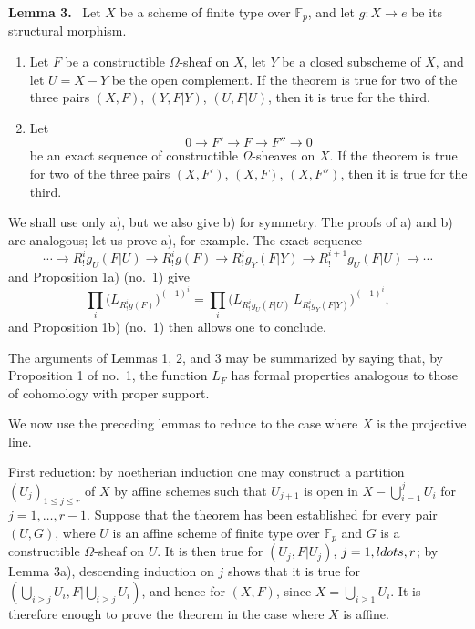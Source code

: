 \documentclass[11pt]{article}
\newenvironment{statement}[1]{\par\medskip\noindent\textbf{#1.}\ }{\par\medskip}
\begin{document}
\begin{statement}{Lemma 3}
Let $X$ be a scheme of finite type over $\mathbb F_p$, and let $g:X\to e$ be its structural morphism.
\begin{enumerate}[label=\alph*)]
\item Let $F$ be a constructible $\Omega$-sheaf on $X$, let $Y$ be a closed subscheme of $X$, and let $U=X-Y$ be the open complement. If the theorem is true for two of the three pairs $(X,F)$, $(Y,F|Y)$, $(U,F|U)$, then it is true for the third.
\item Let
\[
0\longrightarrow F'\longrightarrow F\longrightarrow F''\longrightarrow0
\]
be an exact sequence of constructible $\Omega$-sheaves on $X$. If the theorem is true for two of the three pairs $(X,F')$, $(X,F)$, $(X,F'')$, then it is true for the third.
\end{enumerate}
\end{statement}

We shall use only a), but we also give b) for symmetry. The proofs of a) and b) are analogous; let us prove a), for example. The exact sequence
\[
\cdots\longrightarrow R^i_!g_U(F|U)\longrightarrow R^i_!g(F)
\longrightarrow R^i_!g_Y(F|Y)\longrightarrow R^{i+1}_!g_U(F|U)\longrightarrow\cdots
\]
and Proposition 1a) (no.~1) give
\[
\prod_i\bigl(L_{R^i_!g(F)}\bigr)^{(-1)^i}
=\prod_i\bigl(L_{R^i_!g_U(F|U)}\,L_{R^i_!g_Y(F|Y)}\bigr)^{(-1)^i},
\]
and Proposition 1b) (no.~1) then allows one to conclude.

The arguments of Lemmas 1, 2, and 3 may be summarized by saying that, by Proposition 1 of no.~1, the function $L_F$ has formal properties analogous to those of cohomology with proper support.

We now use the preceding lemmas to reduce to the case where $X$ is the projective line.

First reduction: by noetherian induction one may construct a partition $(U_j)_{1\le j\le r}$ of $X$ by affine schemes such that $U_{j+1}$ is open in $X-\bigcup_{i=1}^jU_i$ for $j=1,\ldots,r-1$. Suppose that the theorem has been established for every pair $(U,G)$, where $U$ is an affine scheme of finite type over $\mathbb F_p$ and $G$ is a constructible $\Omega$-sheaf on $U$. It is then true for $(U_j,F|U_j)$, $j=1,\\ldots,r$; by Lemma 3a), descending induction on $j$ shows that it is true for $(\bigcup_{i\ge j}U_i,F|\bigcup_{i\ge j}U_i)$, and hence for $(X,F)$, since $X=\bigcup_{i\ge1}U_i$. It is therefore enough to prove the theorem in the case where $X$ is affine.
\end{document}

